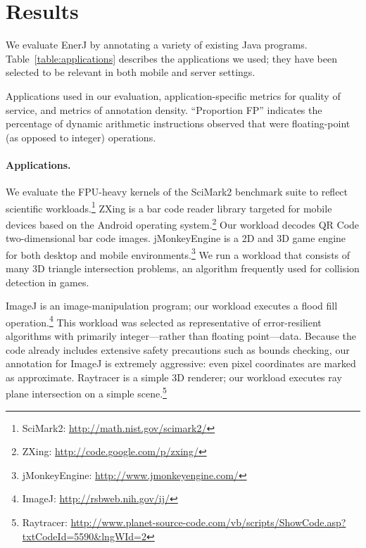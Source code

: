 \section{Results}
\label{sec:res}

We evaluate EnerJ by annotating a variety of existing Java
programs. Table~\ref{table:applications} describes the applications we
used; they have been selected to be relevant in both mobile and server
settings. %

\begin{table}
\small
\begin{center}

\vspace{-1ex}
\end{center}
\caption{Applications used in our evaluation,
application-specific metrics for quality of service, and
metrics of annotation density. ``Proportion FP''
indicates the percentage of dynamic arithmetic instructions observed that were
floating-point (as opposed to integer) operations.
}
\label{table:applications}
\end{table}

\paragraph{Applications.} We evaluate the FPU-heavy kernels of the SciMark2 benchmark suite to
reflect scientific workloads.\footnote{SciMark2:
  \url{http://math.nist.gov/scimark2/}} ZXing is a bar code reader library
targeted for mobile devices based on the Android operating
system.\footnote{ZXing: \url{http://code.google.com/p/zxing/}} Our workload
decodes QR Code two-dimensional bar code images. jMonkeyEngine is a 2D
and 3D game engine for both desktop and mobile
environments.\footnote{jMonkeyEngine: \url{http://www.jmonkeyengine.com/}}
We run a workload that consists of many 3D triangle intersection
problems, an algorithm frequently used for collision detection in
games.

ImageJ is an image-manipulation program; our workload executes a flood fill
operation.\footnote{ImageJ: \url{http://rsbweb.nih.gov/ij/}} This workload was
selected as representative of error-resilient algorithms with primarily
integer---rather than floating point---data.
Because the code already includes extensive
safety precautions such as bounds checking, our annotation for ImageJ is
extremely aggressive: even pixel coordinates are marked as approximate.
Raytracer is a simple 3D renderer; our workload executes
ray plane intersection on a simple scene.\footnote{Raytracer:
\url{http://www.planet-source-code.com/vb/scripts/ShowCode.asp?txtCodeId=5590&lngWId=2}}

